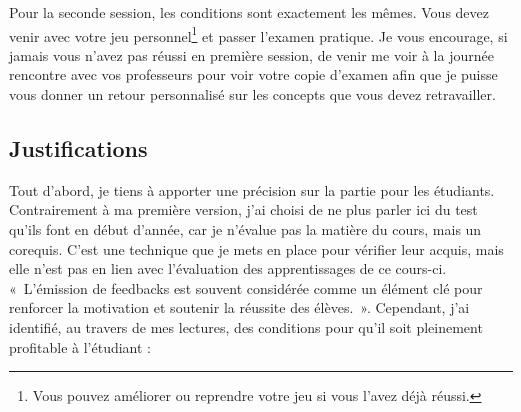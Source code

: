 Pour la seconde session, les conditions sont exactement les mêmes. Vous devez venir avec votre jeu personnel\footnote{Vous pouvez améliorer ou reprendre votre jeu si vous l’avez déjà réussi.} et passer l'examen pratique. Je vous encourage, si jamais vous n'avez pas réussi en première session, de venir me voir à la journée rencontre avec vos professeurs pour voir votre copie d'examen afin que je puisse vous donner un retour personnalisé sur les concepts que vous devez retravailler.
\clearpage
\subsection{Justifications}
\label{evaluation_des_apprentissages_justifications}

Tout d'abord, je tiens à apporter une précision sur la partie pour les étudiants. Contrairement à ma première version, j'ai choisi de ne plus parler ici du test qu'ils font en début d'année, car je n'évalue pas la matière du cours, mais un corequis. C'est une technique que je mets en place pour vérifier leur acquis, mais elle n'est pas en lien avec l'évaluation des apprentissages de ce cours-ci.\\

«~L’émission de feedbacks est souvent considérée comme un élément clé pour renforcer la motivation et soutenir la réussite des élèves.~»\cite{georges2011feedbacks}. Cependant, j'ai identifié, au travers de mes lectures, des conditions pour qu'il soit pleinement profitable à l'étudiant :

